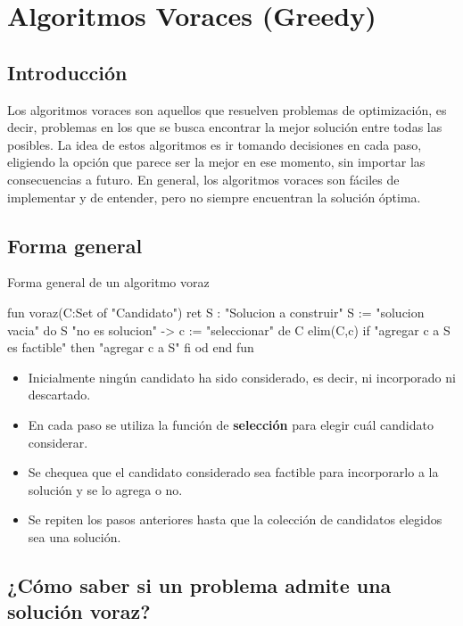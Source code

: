 \chapter{Algoritmos Voraces (Greedy)}

\section{Introducción}

Los algoritmos voraces son aquellos que resuelven problemas de optimización, es decir, problemas en los que se busca encontrar la mejor solución entre todas las posibles. La idea de estos algoritmos es ir tomando decisiones en cada paso, eligiendo la opción que parece ser la mejor en ese momento, sin importar las consecuencias a futuro. En general, los algoritmos voraces son fáciles de implementar y de entender, pero no siempre encuentran la solución óptima.

\section{Forma general}

\begin{codebox}{Forma general de un algoritmo voraz}
\begin{pascallike}
fun voraz(C:Set of "Candidato") ret S : "Solucion a construir"
	S := "solucion vacia"
	do S "no es solucion" -> 
		c := "seleccionar" de C
		elim(C,c)
		if "agregar c a S es factible" then
			"agregar c a S"
		fi
	od
end fun
\end{pascallike}    
\end{codebox}

\begin{itemize}
    \item Inicialmente ningún candidato ha sido considerado, es decir, ni incorporado ni descartado.
    \item En cada paso se utiliza la función de \textbf{selección} para elegir cuál candidato considerar.
    \item Se chequea que el candidato considerado sea factible para incorporarlo a la solución y se lo agrega o no.
    \item Se repiten los pasos anteriores hasta que la colección de candidatos elegidos sea una solución.
\end{itemize}

\section{¿Cómo saber si un problema admite una solución voraz?}

